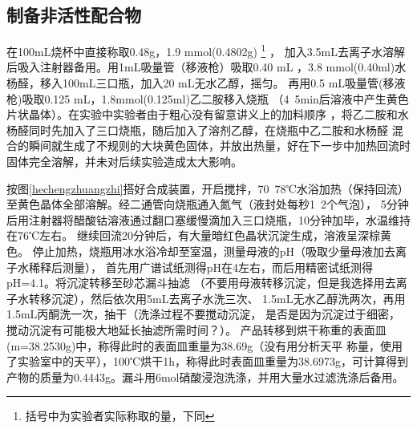 \documentclass[a4paper,zihao=5,UTF8]{ctexart}
\begin{document}
    \subsection{制备非活性配合物}
    在100mL烧杯中直接称取0.48g，1.9 mmol(0.4802g)
    \footnote{括号中为实验者实际称取的量，下同}
    ，
    加入3.5mL去离子水溶解后吸入注射器备用。用1mL吸量管（移液枪）吸取0.40 mL
    ，3.8 mmol(0.40ml)水杨醛，移入100mL三口瓶，加入20 mL无水乙醇，摇匀。
    再用0.5 mL吸量管(移液枪)吸取0.125 mL，1.8mmol(0.125ml)乙二胺移入烧瓶
    （4~5min后溶液中产生黄色片状晶体）。在实验中实验者由于粗心没有留意讲义上的加料顺序
    ，将乙二胺和水杨醛同时先加入了三口烧瓶，随后加入了溶剂乙醇，在烧瓶中乙二胺和水杨醛
    混合的瞬间就生成了不规则的大块黄色固体，并放出热量，好在下一步中加热回流时
    固体完全溶解，并未对后续实验造成太大影响。
    \par 
    按图\ref{hechengzhuangzhi}搭好合成装置，开启搅拌，70~78℃水浴加热（保持回流）
    至黄色晶体全部溶解。经二通管向烧瓶通入氮气（液封处每秒1~2个气泡），
    5分钟后用注射器将醋酸钴溶液通过翻口塞缓慢滴加入三口烧瓶，10分钟加毕，水温维持在76℃左右。
    继续回流20分钟后，有大量暗红色晶状沉淀生成，溶液呈深棕黄色。
    停止加热，烧瓶用冰水浴冷却至室温，测量母液的pH（吸取少量母液加去离子水稀释后测量），
    首先用广谱试纸测得pH在4左右，而后用精密试纸测得pH=4.1。将沉淀转移至砂芯漏斗抽滤
    （不要用母液转移沉淀，但是我选择用去离子水转移沉淀），然后依次用5mL去离子水洗三次、
    1.5mL无水乙醇洗两次，再用1.5mL丙酮洗一次，抽干（洗涤过程不要搅动沉淀，
    是否是因为沉淀过于细密，搅动沉淀有可能极大地延长抽滤所需时间？）。
    产品转移到烘干称重的表面皿(m=38.2530g)中，称得此时的表面皿重量为38.69g（没有用分析天平
    称量，使用了实验室中的天平），100℃烘干1h，称得此时表面皿重量为38.6973g，可计算得到
    产物的质量为0.4443g。漏斗用6mol硝酸浸泡洗涤，并用大量水过滤洗涤后备用。
\end{document}
